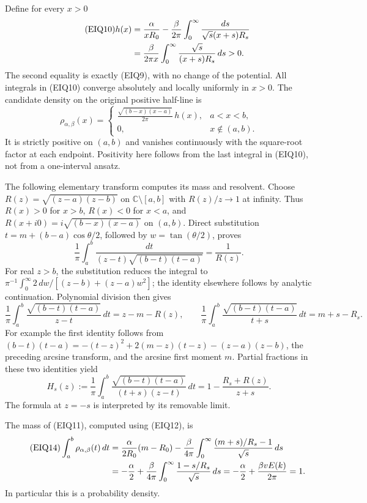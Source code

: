 Define for every $x>0$
\begin{align}\tag{EIQ10}
 h(x)
 &=\frac\alpha{xR_0}
   -\frac\beta{2\pi}
       \int_0^\infty\frac{ds}{\sqrt s(x+s)R_s} \\
 &=\frac\beta{2\pi x}
       \int_0^\infty\frac{\sqrt s}{(x+s)R_s}\,ds>0.\notag
\end{align}
The second equality is exactly (EIQ9), with no change of the potential.
All integrals in (EIQ10) converge absolutely and locally uniformly in
$x>0$.  The candidate density on the original positive half-line is
\begin{equation}\tag{EIQ11}
 \rho_{\alpha,\beta}(x)=
 \begin{cases}
 \displaystyle
 \frac{\sqrt{(b-x)(x-a)}}{2\pi}\,h(x),&a<x<b,\\
 0,&x\notin(a,b).
 \end{cases}
\end{equation}
It is strictly positive on $(a,b)$ and vanishes continuously with the
square-root factor at each endpoint.  Positivity here follows from the
last integral in (EIQ10), not from a one-interval ansatz.

The following elementary transform computes its mass and resolvent.
Choose $R(z)=\sqrt{(z-a)(z-b)}$ on $\mathbb C\setminus[a,b]$ with
$R(z)/z\to1$ at infinity. Thus $R(x)>0$ for $x>b$,
$R(x)<0$ for $x<a$, and $R(x+i0)=i\sqrt{(b-x)(x-a)}$ on $(a,b)$.
Direct substitution $t=m+(b-a)\cos\theta/2$, followed by
$w=\tan(\theta/2)$, proves
\[
 \frac1\pi\int_a^b\frac{dt}{(z-t)\sqrt{(b-t)(t-a)}}=\frac1{R(z)}.
\]
For real $z>b$, the substitution reduces the integral to
$\pi^{-1}\int_0^\infty2\,dw/[(z-b)+(z-a)w^2]$;
the identity elsewhere follows by analytic continuation.
Polynomial division then gives
\begin{equation}\tag{EIQ12}
 \frac1\pi\int_a^b\frac{\sqrt{(b-t)(t-a)}}{z-t}\,dt
     =z-m-R(z),\qquad
 \frac1\pi\int_a^b\frac{\sqrt{(b-t)(t-a)}}{t+s}\,dt
     =m+s-R_s.
\end{equation}
For example the first identity follows from
$(b-t)(t-a)=-(t-z)^2+2(m-z)(t-z)-(z-a)(z-b)$,
the preceding arcsine transform, and the arcsine first moment $m$.
Partial fractions in these two identities yield
\begin{equation}\tag{EIQ13}
 H_s(z):=\frac1\pi\int_a^b
       \frac{\sqrt{(b-t)(t-a)}}{(t+s)(z-t)}\,dt
       =1-\frac{R_s+R(z)}{z+s}.
\end{equation}
The formula at $z=-s$ is interpreted by its removable limit.

The mass of (EIQ11), computed using (EIQ12), is
\begin{align}\tag{EIQ14}
 \int_a^b\rho_{\alpha,\beta}(t)\,dt
 &=\frac\alpha{2R_0}(m-R_0)
 -\frac\beta{4\pi}\int_0^\infty
       \frac{(m+s)/R_s-1}{\sqrt s}\,ds\\
 &=-\frac\alpha2+
   \frac\beta{4\pi}\int_0^\infty\frac{1-s/R_s}{\sqrt s}\,ds
 =-\frac\alpha2+\frac{\beta vE(k)}{2\pi}=1.\notag
\end{align}
In particular this is a probability density.


